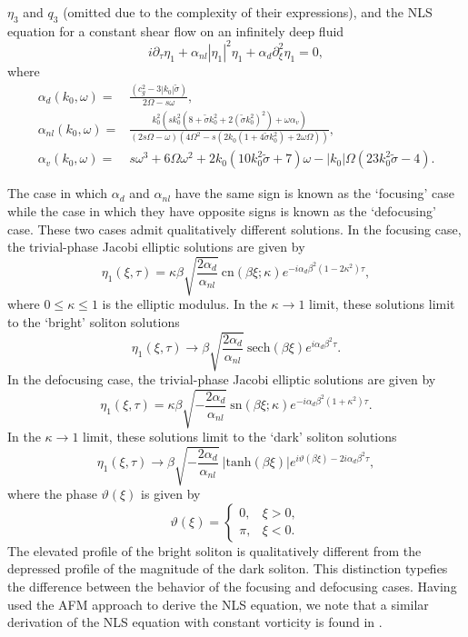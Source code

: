 \documentclass[a4paper,11pt]{article}
\newcommand{\ba}{\begin{array}}
\newcommand{\ea}{\end{array}}
\newcommand{\p}{\partial}
\begin{document}
$\eta_{3}$ and $q_{3}$ (omitted due to the complexity of their expressions), and the NLS equation for a constant shear flow on an infinitely deep fluid
\[
i \p_{\tau}\eta_{1} + \alpha_{nl}\left|\eta_{1}\right|^{2}\eta_{1} + \alpha_{d}\p_{\xi}^{2}\eta_{1} = 0,
\]
where
\begin{align*}
\alpha_{d}(k_{0},\omega) = & \frac{(c^2_{g} - 3|k_{0}|\tilde{\sigma})}{2\Omega-s\omega},\\
\alpha_{nl}(k_{0},\omega) = & \frac{k_{0}^{2}\left( sk_{0}^{2}\left(8 + \tilde{\sigma}k_{0}^{2} + 2(\tilde{\sigma}k_{0}^{2})^{2}\right) + \omega \alpha_{v}\right)}{\left(2s\Omega -\omega\right)\left(4\Omega^2-s(2k_{0}(1+4\tilde{\sigma}k_{0}^{2})+2\omega\Omega)\right)}, \\
\alpha_{v}(k_{0},\omega) = & s\omega^{3} + 6\Omega\omega^2 + 2k_{0}(10k_{0}^{2}\tilde{\sigma} + 7)\omega -\left|k_{0}\right|\Omega(23 k_{0}^{2}\tilde{\sigma}-4). 
\end{align*}

The case in which $\alpha_{d}$ and $\alpha_{nl}$ have the same sign is
known as the `focusing' case while the case in which they have opposite
signs is known as the `defocusing' case.  These two cases admit
qualitatively different solutions.  In the focusing case, the
trivial-phase Jacobi elliptic solutions are given by
\begin{equation}
\eta_{1}(\xi,\tau) = \kappa\beta \sqrt{\frac{2\alpha_{d}}{\alpha_{nl}}}~\mbox{cn}(\beta \xi;\kappa)e^{-i\alpha_{d}\beta^{2}(1-2\kappa^2)\tau},
\label{cnsolns}
\end{equation}
where $0\le\kappa\le1$ is the elliptic modulus.  In the $\kappa 
\rightarrow 1$ limit, these solutions limit to the `bright' soliton
solutions
\[
\eta_{1}(\xi,\tau) \rightarrow \beta \sqrt{\frac{2\alpha_{d}}{\alpha_{nl}}}~\mbox{sech}(\beta \xi)e^{i\alpha_{d}\beta^{2}\tau}.
\]
In the defocusing case, the trivial-phase Jacobi elliptic solutions
are given by 
\begin{equation}
\eta_{1}(\xi,\tau) = \kappa\beta \sqrt{-\frac{2\alpha_{d}}{\alpha_{nl}}}~\mbox{sn}(\beta \xi;\kappa) e^{-i\alpha_{d}\beta^{2}(1+\kappa^2)\tau}.
\label{snsolns}
\end{equation}
In the $\kappa\rightarrow1$ limit, these solutions limit to the `dark'
soliton solutions
\[
\eta_{1}(\xi,\tau) \rightarrow \beta \sqrt{-\frac{2\alpha_{d}}{\alpha_{nl}}}~\left|\mbox{tanh}(\beta \xi)\right| e^{i\vartheta(\beta\xi)-2i\alpha_{d}\beta^{2}\tau}, 
\] 
where the phase $\vartheta(\xi)$ is given by
\[
\vartheta(\xi) = \left \{ \ba{rl}  0, & \xi > 0, \\ \pi, & \xi < 0. \ea\right.
\]
The elevated profile of the bright soliton is qualitatively different from the depressed profile of the magnitude of the dark soliton.  This distinction
typefies the difference between the behavior of the focusing and defocusing cases.  Having used the AFM approach to derive the NLS equation, we note that
a similar derivation of the NLS equation with constant vorticity is
found in \cite{thomas2012nonlinear}.
\end{document}
